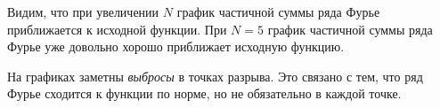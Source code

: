 Видим, что при увеличении $N$ график частичной суммы ряда Фурье приближается к исходной функции. При $N = 5$ график частичной суммы ряда Фурье уже довольно хорошо приближает исходную функцию. 

На графиках заметны \textit{выбросы} в точках разрыва. Это связано с тем, что ряд Фурье сходится к функции по норме, но не обязательно в каждой точке. 
